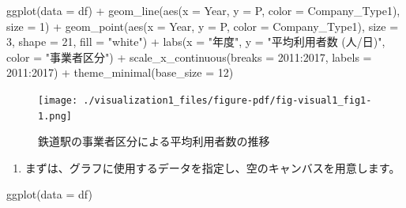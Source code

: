 \documentclass[
  a4paper,
  pandoc,
  ja=standard,
  jafont=haranoaji]{bxjsbook}
\newenvironment{Shaded}{\begin{snugshade}}{\end{snugshade}}
\newcommand{\AttributeTok}[1]{\textcolor[rgb]{0.00,0.48,0.65}{#1}}
\newcommand{\DecValTok}[1]{\textcolor[rgb]{0.68,0.00,0.00}{#1}}
\newcommand{\FunctionTok}[1]{\textcolor[rgb]{0.28,0.35,0.67}{#1}}
\newcommand{\NormalTok}[1]{\textcolor[rgb]{0.00,0.48,0.65}{#1}}
\newcommand{\SpecialCharTok}[1]{\textcolor[rgb]{0.37,0.37,0.37}{#1}}
\newcommand{\StringTok}[1]{\textcolor[rgb]{0.13,0.47,0.30}{#1}}
\providecommand{\tightlist}{%
  \setlength{\itemsep}{0pt}\setlength{\parskip}{0pt}}
\begin{document}
\begin{Shaded}
\begin{Highlighting}[numbers=left,,]
\FunctionTok{ggplot}\NormalTok{(}\AttributeTok{data =}\NormalTok{ df) }\SpecialCharTok{+}
  \FunctionTok{geom\_line}\NormalTok{(}\FunctionTok{aes}\NormalTok{(}\AttributeTok{x =}\NormalTok{ Year, }\AttributeTok{y =}\NormalTok{ P, }\AttributeTok{color =}\NormalTok{ Company\_Type1), }
            \AttributeTok{size =} \DecValTok{1}\NormalTok{) }\SpecialCharTok{+}
  \FunctionTok{geom\_point}\NormalTok{(}\FunctionTok{aes}\NormalTok{(}\AttributeTok{x =}\NormalTok{ Year, }\AttributeTok{y =}\NormalTok{ P, }\AttributeTok{color =}\NormalTok{ Company\_Type1), }
             \AttributeTok{size =} \DecValTok{3}\NormalTok{, }\AttributeTok{shape =} \DecValTok{21}\NormalTok{, }\AttributeTok{fill =} \StringTok{"white"}\NormalTok{) }\SpecialCharTok{+}
  \FunctionTok{labs}\NormalTok{(}\AttributeTok{x =} \StringTok{"年度"}\NormalTok{, }\AttributeTok{y =} \StringTok{"平均利用者数 (人/日)"}\NormalTok{, }\AttributeTok{color =} \StringTok{"事業者区分"}\NormalTok{) }\SpecialCharTok{+}
  \FunctionTok{scale\_x\_continuous}\NormalTok{(}\AttributeTok{breaks =} \DecValTok{2011}\SpecialCharTok{:}\DecValTok{2017}\NormalTok{, }\AttributeTok{labels =} \DecValTok{2011}\SpecialCharTok{:}\DecValTok{2017}\NormalTok{) }\SpecialCharTok{+}
  \FunctionTok{theme\_minimal}\NormalTok{(}\AttributeTok{base\_size =} \DecValTok{12}\NormalTok{)}
\end{Highlighting}
\end{Shaded}

\begin{figure}[H]

{\centering \texttt{[image: ./visualization1\_files/figure-pdf/fig-visual1\_fig1-1.png]}

}

\caption{\label{fig-visual1_fig1}鉄道駅の事業者区分による平均利用者数の推移}

\end{figure}

\begin{enumerate}
\def\labelenumi{\arabic{enumi}.}
\tightlist
\item
  まずは、グラフに使用するデータを指定し、空のキャンバスを用意します。
\end{enumerate}

\begin{Shaded}
\begin{Highlighting}[numbers=left,,]
\FunctionTok{ggplot}\NormalTok{(}\AttributeTok{data =}\NormalTok{ df)}
\end{Highlighting}
\end{Shaded}
\end{document}
